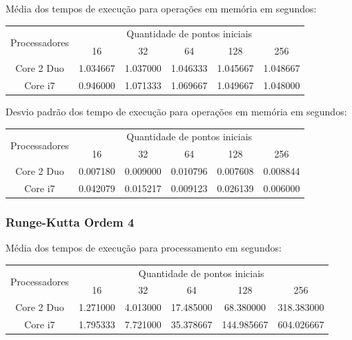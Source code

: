     \hspace{1mm}\newline
    
    \noindent Média dos tempos de execução para operações em memória em segundos:\\
    \begin{tabular}{| c | c | c | c | c | c |}
      \hline
      \multirow{2}{*}{Processadores}& \multicolumn{5}{|c|}{Quantidade de pontos iniciais} \\ \cline{2-6}
      & 16 & 32 & 64 & 128 & 256 \\ \hline
      Core 2 Duo & 1.034667 & 1.037000 & 1.046333 & 1.045667 & 1.048667\\ \hline
      Core i7 & 0.946000 & 1.071333 & 1.069667 & 1.049667 & 1.048000\\ \hline

      \hline
    \end{tabular}
    
    \hspace{1mm}\newline
    
    \noindent Desvio padrão dos tempo de execução para operações em memória em segundos:\\
    \begin{tabular}{| c | c | c | c | c | c |}
      \hline
      \multirow{2}{*}{Processadores}& \multicolumn{5}{|c|}{Quantidade de pontos iniciais} \\ \cline{2-6}
      & 16 & 32 & 64 & 128 & 256 \\ \hline
      Core 2 Duo & 0.007180 & 0.009000 & 0.010796 & 0.007608 & 0.008844\\ \hline
      Core i7 & 0.042079 & 0.015217 & 0.009123 & 0.026139 & 0.006000 \\ \hline

      \hline
    \end{tabular}
    
    \subsubsection{Runge-Kutta Ordem 4} 
    Média dos tempos de execução para processamento em segundos:\\
    \begin{tabular}{| c | c | c | c | c | c |}
      \hline
      \multirow{2}{*}{Processadores}& \multicolumn{5}{|c|}{Quantidade de pontos iniciais} \\ \cline{2-6}
      & 16 & 32 & 64 & 128 & 256 \\ \hline
      Core 2 Duo & 1.271000 & 4.013000 & 17.485000 & 68.380000 & 318.383000 \\ \hline
      Core i7 & 1.795333 & 7.721000 & 35.378667 & 144.985667 & 604.026667\\ \hline

      \hline
    \end{tabular}
    
